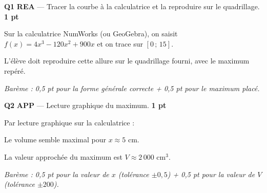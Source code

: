 \documentclass[a4paper,11pt]{article}
\newcommand{\pts}[1]{\hfill\textcolor{gris}{\small\textbf{#1}}}
\newcommand{\comp}[1]{\colorbox{blue!10}{\scriptsize\textbf{#1}}}
\begin{document}
\vspace{6pt}

\textbf{Q1} \comp{REA} — Tracer la courbe à la calculatrice et la reproduire sur le quadrillage. \pts{1 pt}

\begin{corrbox}
Sur la calculatrice NumWorks (ou GeoGebra), on saisit $f(x) = 4x^3 - 120x^2 + 900x$ et on trace sur $[0\,;\,15]$.

\begin{center}
\end{center}

L'élève doit reproduire cette allure sur le quadrillage fourni, avec le maximum repéré.

\smallskip
\textit{Barème : 0,5 pt pour la forme générale correcte + 0,5 pt pour le maximum placé.}
\end{corrbox}

\textbf{Q2} \comp{APP} — Lecture graphique du maximum. \pts{1 pt}

\begin{corrbox}
Par lecture graphique sur la calculatrice :

Le volume semble maximal pour $x \approx \boxed{5 \text{ cm}}$.

La valeur approchée du maximum est $V \approx \boxed{2\,000 \text{ cm}^3}$.

\smallskip
\textit{Barème : 0,5 pt pour la valeur de $x$ (tolérance $\pm 0{,}5$) + 0,5 pt pour la valeur de $V$ (tolérance $\pm 200$).}
\end{corrbox}
\end{document}
